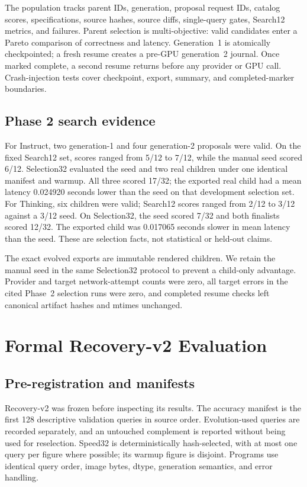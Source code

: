 \documentclass{article}
\begin{document}
The population tracks parent IDs, generation, proposal request IDs, catalog scores,
specifications, source hashes, source diffs, single-query gates, Search12 metrics,
and failures. Parent selection is multi-objective: valid candidates enter a
Pareto comparison of correctness and latency. Generation~1 is atomically
checkpointed; a fresh resume creates a pre-GPU generation~2 journal. Once marked
complete, a second resume returns before any provider or GPU call. Crash-injection
tests cover checkpoint, export, summary, and completed-marker boundaries.

\subsection{Phase 2 search evidence}
For Instruct, two generation-1 and four generation-2 proposals were valid. On the
fixed Search12 set, scores ranged from 5/12 to 7/12, while the manual seed scored
6/12. Selection32 evaluated the seed and two real children under one identical
manifest and warmup. All three scored 17/32; the exported real child had a mean
latency 0.024920 seconds lower than the seed on that development selection set.
For Thinking, six children were valid; Search12 scores ranged from 2/12 to 3/12
against a 3/12 seed. On Selection32, the seed scored 7/32 and both finalists
scored 12/32. The exported child was 0.017065 seconds slower in mean latency than
the seed. These are selection facts, not statistical or held-out claims.

The exact evolved exports are immutable rendered children. We retain the manual
seed in the same Selection32 protocol to prevent a child-only advantage. Provider
and target network-attempt counts were zero, all target errors in the cited Phase~2
selection runs were zero, and completed resume checks left canonical artifact
hashes and mtimes unchanged.

\section{Formal Recovery-v2 Evaluation}
\subsection{Pre-registration and manifests}
Recovery-v2 was frozen before inspecting its results. The accuracy manifest is
the first 128 descriptive validation queries in source order. Evolution-used
queries are recorded separately, and an untouched complement is reported without
being used for reselection. Speed32 is deterministically hash-selected, with at
most one query per figure where possible; its warmup figure is disjoint. Programs
use identical query order, image bytes, dtype, generation semantics, and error
handling.
\end{document}
